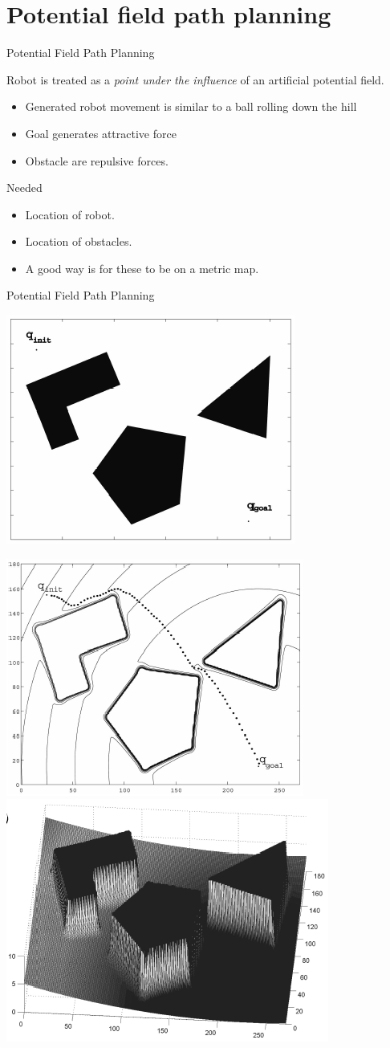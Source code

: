 \documentclass[compress]{beamer}
\begin{document}
\section{Potential field path planning}

\begin{frame}{Potential Field Path Planning}

Robot is treated as a \emph{point under the influence} of an artificial
potential field.

\begin{itemize}
\item Generated robot movement is similar to a ball rolling down the hill
\item Goal generates attractive force
\item Obstacle are repulsive forces.
\end{itemize}

Needed

\begin{itemize}
\item Location of robot.
\item Location of obstacles.
\item A good way is for these to be on a metric map.
\end{itemize}

\end{frame}

\begin{frame}{Potential Field Path Planning}

    \begin{center}
        \includegraphics[width=0.4\linewidth]{potentialfields1}

        \includegraphics[width=0.4\linewidth]{potentialfields2}
        \includegraphics[width=0.4\linewidth]{potentialfields3}
    \end{center}
\end{frame}
\end{document}
